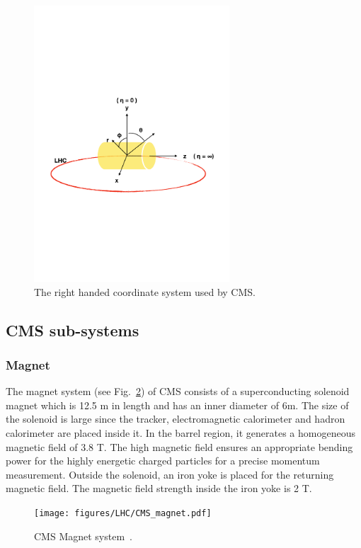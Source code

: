 \begin{figure}[!htbp]
	\centering
	\includegraphics[width=0.65\textwidth]{figures/LHC/CMS-coordinate-system.pdf}
	\caption{The right handed coordinate system used by CMS.}
	\label{fig:cms-coordinate-system}
\end{figure}

\subsection{CMS sub-systems} %
\label{sub:cms_sub_systems}

\subsubsection{Magnet} %
\label{ssub:magnet}
The magnet system (see Fig.~\ref{fig:CMS-magnet}) of CMS consists of a superconducting solenoid magnet which is 12.5 m in length and has an inner diameter of 6m. The size of the solenoid is large since the tracker, electromagnetic calorimeter and hadron calorimeter are placed inside it. In the barrel region, it generates a homogeneous magnetic field of 3.8 T. The high magnetic field ensures an appropriate bending power for the highly energetic charged particles for a precise momentum measurement. Outside the solenoid, an iron yoke is placed for the returning magnetic field. The magnetic field strength inside the iron yoke is 2 T.
\begin{figure}[!htbp]
	\centering
	\texttt{[image: figures/LHC/CMS\_magnet.pdf]}
	\caption{CMS Magnet system~\cite{Brice2007}.}
	\label{fig:CMS-magnet}
\end{figure}

